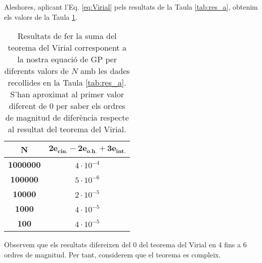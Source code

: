 \documentclass[a4paper]{article}
\begin{document}
Aleshores, aplicant l'Eq. \ref{eq:Virial} pels resultats de la Taula \ref{tab:res_a}, obtenim els valors de la Taula \ref{tab:res_d}.

\begin{table}[h!]
    \centering
    \begin{tabular}{|c|c|}
        \hline
        \rowcolor[HTML]{EFEFEF}
        \textbf{N} & $\mathbf{2e_{\text{cin.}}-2e_{\text{o.h.}}+3 e_{\text{int.}}}$ \\ \hline\hline
        \textbf{1000000} & $4\cdot10^{-4}$ \\ \hline
        \textbf{100000} & $5\cdot10^{-6}$ \\ \hline
        \textbf{10000} & $2\cdot10^{-5}$ \\ \hline
        \textbf{1000} & $4\cdot10^{-5}$ \\ \hline
        \textbf{100} & $4\cdot10^{-5}$ \\ \hline
    \end{tabular}
\caption{Resultats de fer la suma del teorema del Virial corresponent a la nostra equació de GP per diferents valors de $N$ amb les dades recollides en la Taula \ref{tab:res_a}. S'han aproximat al primer valor diferent de $0$ per saber els ordres de magnitud de diferència respecte al resultat del teorema del Virial.}
\label{tab:res_d}
\end{table}

Observem que els resultats difereixen del $0$ del teorema del Virial en $4$ fins a $6$ ordres de magnitud. Per tant, considerem que el teorema es compleix.
\end{document}
